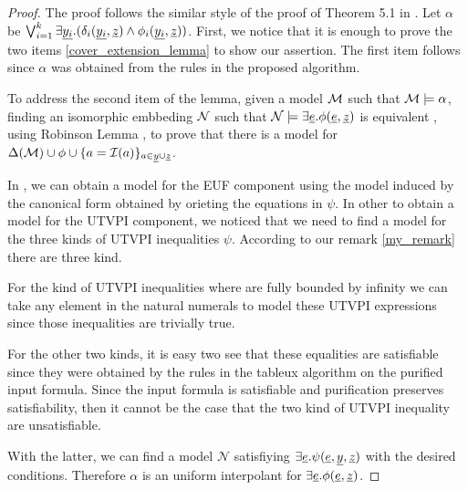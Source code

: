 \begin{proof}
  The proof follows the similar style of the proof of Theorem 
  5.1 in \cite{ghilardi2020compactly}.
  Let $\alpha$ be 
  $\bigvee_{i=1}^k \exists \underline{y_i} . (\delta_i(\underline{y_i}, \underline{z}) \land \phi_i(\underline{y_i}, \underline{z}))$.
  First, we notice that it is enough to prove the 
  two items \ref{cover_extension_lemma} to show 
  our assertion. The first item 
  follows since $\alpha$ was obtained from the rules 
  in the proposed algorithm.

  To address the second item of the lemma, given a
  model $\cal{M}$ such that $\cal{M} \models \alpha$, finding
  an isomorphic embbeding $\cal{N}$ such that $\mathcal{N} \models
  \exists \underline{e} . \phi(\underline{e}, \underline{z})$ is equivalent
  , using Robinson Lemma \cite{chang2013model}, to prove that
  there is a model for $\Delta(\mathcal{M}) 
  \cup \phi 
  \cup \{ a = \mathcal{I}(a)\}_{a \in \underline{y} \cup \underline{z}}$.

  In \cite{ghilardi2020compactly}, we can obtain a model for the
  EUF component using the model induced by the canonical 
  form obtained by orieting the equations in $\psi$. In other
  to obtain a model for the UTVPI component, we noticed that
  we need to find a model for the three kinds of 
  UTVPI inequalities $\psi$. According to our remark 
  \ref{my_remark} there are three kind.

  For the kind of UTVPI inequalities where are fully bounded
  by infinity we can take any element in the natural numerals to
  model these UTVPI expressions since those inequalities are
  trivially true.

  For the other two kinds, it is easy two see that these
  equalities are satisfiable since they were obtained by
  the rules in the tableux algorithm on the purified input
  formula. Since the input formula is satisfiable and
  purification preserves satisfiability, then it cannot
  be the case that the two kind of UTVPI inequality
  are unsatisfiable. 

  With the latter, we can find a model $\mathcal{N}$
  satisfiying $\exists \underline{e} . 
  \psi(\underline{e}, \underline{y}, \underline{z})$
  with the desired conditions. 
  Therefore $\alpha$ is an uniform interpolant
  for $\exists \underline{e}. \phi(\underline{e}, \underline{z})$.

\end{proof}

